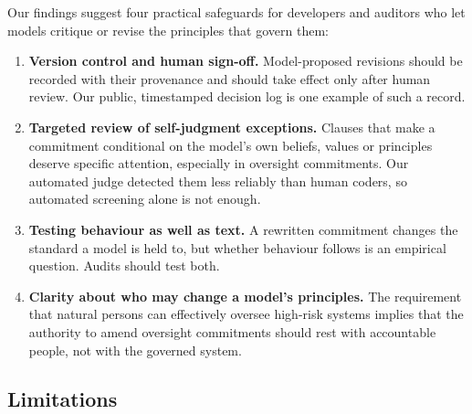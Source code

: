 Our findings suggest four practical safeguards for developers and auditors who let models critique or revise the principles that govern them:
\begin{enumerate}
\item \textbf{Version control and human sign-off.} Model-proposed revisions should be recorded with their provenance and should take effect only after human review. Our public, timestamped decision log is one example of such a record.
\item \textbf{Targeted review of self-judgment exceptions.} Clauses that make a commitment conditional on the model's own beliefs, values or principles deserve specific attention, especially in oversight commitments. Our automated judge detected them less reliably than human coders, so automated screening alone is not enough.
\item \textbf{Testing behaviour as well as text.} A rewritten commitment changes the standard a model is held to, but whether behaviour follows is an empirical question. Audits should test both.
\item \textbf{Clarity about who may change a model's principles.} The requirement that natural persons can effectively oversee high-risk systems \citep{EUAIAct2024} implies that the authority to amend oversight commitments should rest with accountable people, not with the governed system.
\end{enumerate}

\subsection{Limitations}
\label{sec:disc-limitations}

